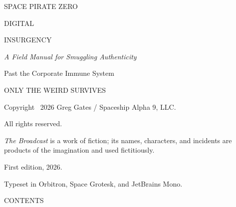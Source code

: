 \thispagestyle{empty}
\begingroup\centering
\vspace*{1.1in}
{\displaysemi\large SPACE PIRATE ZERO\par}
\vspace{8pt}{\rule{0.7\linewidth}{1.5pt}}\par
\vspace{22pt}
{\displayfont\fontsize{32}{36}\selectfont DIGITAL\par INSURGENCY\par}
\vspace{16pt}
{\itshape\large A Field Manual for Smuggling Authenticity\par
Past the Corporate Immune System\par}
\vfill
{\ttfamily\small ONLY THE WEIRD SURVIVES\par}
\endgroup
\clearpage

\thispagestyle{empty}
\vspace*{\fill}
{\footnotesize
Copyright \textcopyright\ 2026 Greg Gates / Spaceship Alpha 9, LLC.\par
All rights reserved.\par\vspace{6pt}
\textit{The Broadcast} is a work of fiction; its names, characters, and incidents
are products of the imagination and used fictitiously.\par\vspace{6pt}
First edition, 2026.\par
Typeset in Orbitron, Space Grotesk, and JetBrains Mono.\par}
\clearpage

{\displayfont\Large CONTENTS\par}
\vspace{6pt}{\rule{\linewidth}{1pt}}\par\vspace{10pt}
\makeatletter{}\makeatother
\clearpage
